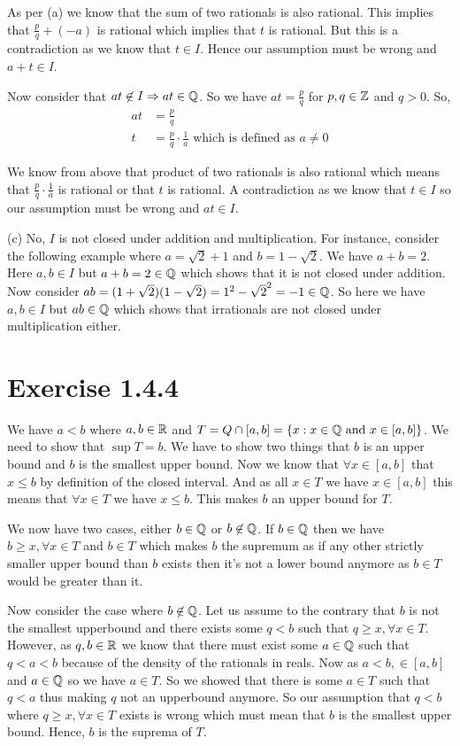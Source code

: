 \documentclass[a4paper]{report}
\begin{document}
As per (a) we know that the sum of two rationals is also rational. This implies that $\frac{p}{q} + (-a)$ is rational which implies that $t$ is rational. But this is a contradiction as we know that $t \in I$. Hence our assumption must be wrong and  $a + t \in I$.

Now consider that $at \not \in I \Rightarrow at \in \mathbb{Q}$. So we have  $at = \frac{p}{q}$ for $p,q \in \mathbb{Z}$ and $q > 0$. So,
\begin{align*}
    at &= \frac{p}{q}\\
    t &= \frac{p}{q} \cdot \frac{1}{a} \text{ which is defined as $a \ne 0$}
\end{align*}

We know from above that product of two rationals is also rational which means that $\frac{p}{q} \cdot \frac{1}{a}$ is rational or that $t$ is rational. A contradiction as we know that  $t  \in I$ so our assumption must be wrong and $at \in I$.


(c) No, $I$ is not closed under addition and multiplication. For instance, consider the following example  where $a = \sqrt{2} + 1$ and  $b = 1 - \sqrt{2}$. We have  $a + b = 2$. Here $a,b \in I$ but  $a + b = 2 \in \mathbb{Q}$ which shows that it is not closed under addition. Now consider  $ab = (1 + \sqrt{2})(1 - \sqrt{2}) = 1^2 - \sqrt{2}^2 = -1 \in \mathbb{Q}$. So here we have $a,b \in I$ but  $ab \in \mathbb{Q}$ which shows that irrationals are not closed under multiplication either.



\section*{Exercise 1.4.4}

We have $a < b $ where  $a,b \in \mathbb{R}$ and  $T = Q \cap [a,b] = \{x: x \in \mathbb{Q} \text{ and } x \in [a, b]\}$. We need to show that $\sup T = b$. We have to show two things that $b $ is an upper bound and  $b$ is the smallest upper bound. Now we know that  $\forall x \in [a, b]$ that  $x \le b$ by definition of the closed interval. And as all $x \in T$ we have  $x \in [a,b]$ this means that  $\forall x \in T$ we have $x \le b$. This makes  $b$ an upper bound for $T$.


\vspace{1em} 

We now have two cases, either $b \in \mathbb{Q}$ or  $b \not \in \mathbb{Q}$. If  $b \in \mathbb{Q}$ then we have  $ b \ge x, \forall x \in T$ and  $b \in T$ which makes  $b$ the supremum as if any other strictly smaller upper bound than $b$ exists then it's not a lower bound anymore as $b \in T$ would be greater than it. 


Now consider the case where $b \not \in \mathbb{Q}$. Let us assume to the contrary that  $ b$ is not the smallest upperbound and  there exists some $q < b$ such that $q \ge x,  \forall x \in T$. However, as $q, b \in \mathbb{R}$ we know that there must exist some $a \in \mathbb{Q}$ such that  $q < a < b$ because of the density of the rationals in reals.  Now as $a < b, \in [a,b]$ and  $a \in \mathbb{Q}$ so we have  $a \in T$. So we showed that there is some  $a \in T$ such that  $q < a$ thus making  $q$ not an upperbound anymore. So our assumption that $q < b$ where $ q \ge x, \forall x \in T$ exists is wrong which must mean that $b$ is the smallest upper bound. Hence, $b$ is the suprema of $T$.
\end{document}
